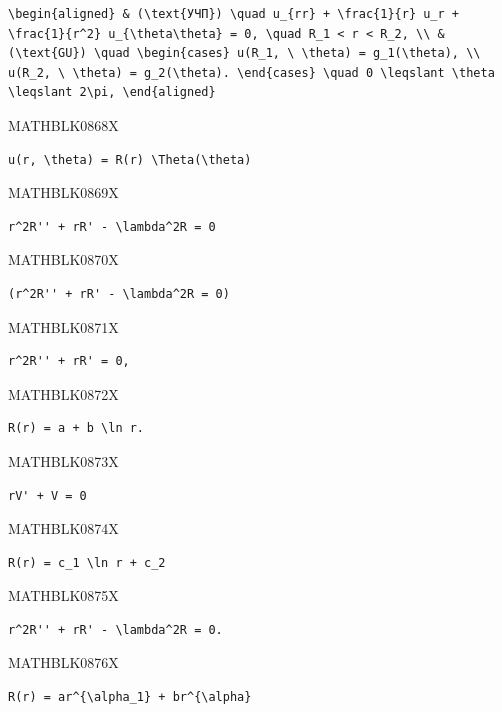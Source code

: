 \documentclass[
  ukrainian,
]{article}
\begin{document}
\begin{verbatim}
\begin{aligned} & (\text{УЧП}) \quad u_{rr} + \frac{1}{r} u_r + \frac{1}{r^2} u_{\theta\theta} = 0, \quad R_1 < r < R_2, \\ & (\text{GU}) \quad \begin{cases} u(R_1, \ \theta) = g_1(\theta), \\ u(R_2, \ \theta) = g_2(\theta). \end{cases} \quad 0 \leqslant \theta \leqslant 2\pi, \end{aligned}
\end{verbatim}

MATHBLK0868X

\begin{verbatim}
u(r, \theta) = R(r) \Theta(\theta)
\end{verbatim}

MATHBLK0869X

\begin{verbatim}
r^2R'' + rR' - \lambda^2R = 0
\end{verbatim}

MATHBLK0870X

\begin{verbatim}
(r^2R'' + rR' - \lambda^2R = 0)
\end{verbatim}

MATHBLK0871X

\begin{verbatim}
r^2R'' + rR' = 0,
\end{verbatim}

MATHBLK0872X

\begin{verbatim}
R(r) = a + b \ln r.
\end{verbatim}

MATHBLK0873X

\begin{verbatim}
rV' + V = 0
\end{verbatim}

MATHBLK0874X

\begin{verbatim}
R(r) = c_1 \ln r + c_2
\end{verbatim}

MATHBLK0875X

\begin{verbatim}
r^2R'' + rR' - \lambda^2R = 0.
\end{verbatim}

MATHBLK0876X

\begin{verbatim}
R(r) = ar^{\alpha_1} + br^{\alpha}
\end{verbatim}
\end{document}
